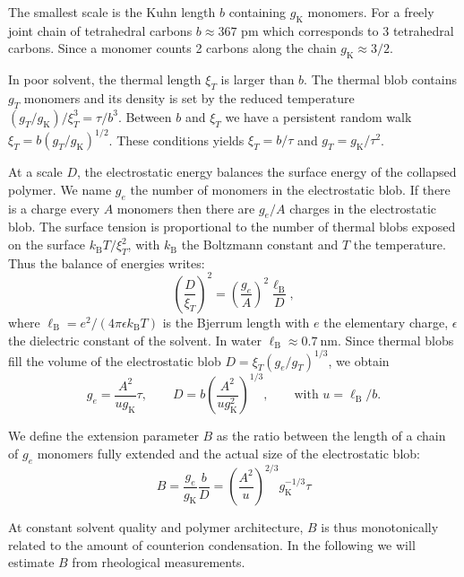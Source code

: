 \documentclass[journal=jacsat,manuscript=article]{achemso}
\begin{document}
The smallest scale is the Kuhn length $b$ containing $g_\mathrm{K}$ monomers. For a freely joint chain of tetrahedral carbons $b\approx 367$ pm which corresponds to 3 tetrahedral carbons. Since a monomer counts 2 carbons along the chain $g_\mathrm{K}\approx 3/2$.

In poor solvent, the thermal length $\xi_T$ is larger than $b$. The thermal blob contains $g_T$ monomers and its density is set by the reduced temperature $(g_T/g_\mathrm{K})/\xi_T^3 = \tau/b^3$. Between $b$ and $\xi_T$ we have a persistent random walk $\xi_T = b (g_T/g_\mathrm{K})^{1/2}$. These conditions yields $\xi_T = b/\tau$ and $g_T = g_\mathrm{K}/\tau^2$.

At a scale $D$, the electrostatic energy balances the surface energy of the collapsed polymer. We name $g_e$ the number of monomers in the electrostatic blob. If there is a charge every $A$ monomers then there are $g_e/A$ charges in the electrostatic blob. The surface tension is proportional to the number of thermal blobs exposed on the surface $k_\mathrm{B}T/\xi_T^2$, with $k_\mathrm{B}$ the Boltzmann constant and $T$ the temperature. Thus the balance of energies writes:
\begin{equation}\left(\frac{D}{\xi_T}\right)^2 = \left(\frac{g_e}{A}\right)^2 \frac{\ell_\mathrm{B}}{D},
\label{eq:electrosurface}
\end{equation}
where $\ell_\mathrm{B} = e^2/(4\pi\epsilon k_\mathrm{B}T)$ is the Bjerrum length with $e$ the elementary charge, $\epsilon$ the dielectric constant of the solvent. In water $\ell_\mathrm{B} \approx \SI{0.7}{\nano\metre}$. Since thermal blobs fill the volume of the electrostatic blob $D = \xi_T \left(g_e/g_T\right)^{1/3}$, we obtain
\begin{equation}
g_e = \frac{A^2}{u g_\mathrm{K}} \tau, \qquad D = b\left(\frac{A^2}{u g_\mathrm{K}^2}\right)^{1/3},\qquad \text{with }u = \ell_\mathrm{B}/b.
\label{eq:geD}
\end{equation}

We define the extension parameter $B$ as the ratio between the length of a chain of $g_e$ monomers fully extended and the actual size of the electrostatic blob: 
\begin{equation}
B = \frac{g_e}{g_\mathrm{K}}\frac{b}{D} = \left(\frac{A^2}{u}\right)^{2/3} g_\mathrm{K}^{-1/3}\tau
\label{eq:B}
\end{equation}

At constant solvent quality and polymer architecture, $B$ is thus monotonically related to the amount of counterion condensation. In the following we will estimate $B$ from rheological measurements.
\end{document}
